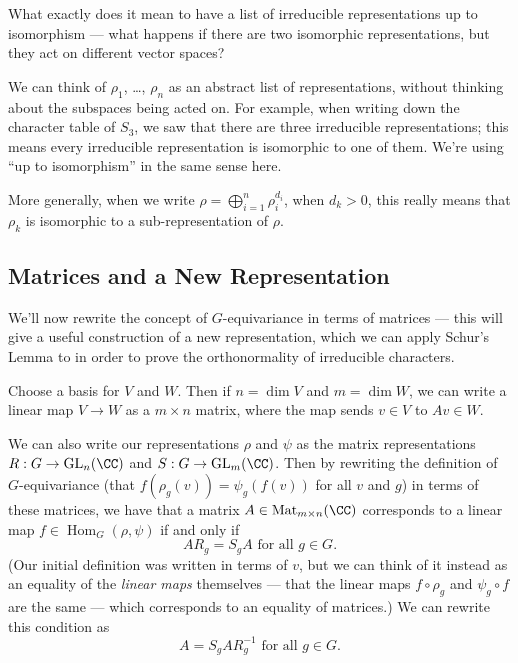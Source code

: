 \begin{question}
What exactly does it mean to have a list of irreducible representations up to isomorphism --- what happens if there are two isomorphic representations, but they act on different vector spaces?
\end{question}

\begin{ans}
We can think of $\rho_1$, \ldots, $\rho_n$ as an abstract list of representations, without thinking about the subspaces being acted on. For example, when writing down the character table of $S_3$, we saw that there are three irreducible representations; this means every irreducible representation is isomorphic to one of them. We're using ``up to isomorphism'' in the same sense here. 

More generally, when we write $\rho = \bigoplus_{i = 1}^n \rho_i^{d_i}$, when $d_k > 0$, this really means that $\rho_k$ is isomorphic to a sub-representation of $\rho$. 
\end{ans}

\subsection{Matrices and a New Representation}

We'll now rewrite the concept of $G$-equivariance in terms of matrices --- this will give a useful construction of a new representation, which we can apply Schur's Lemma to in order to prove the orthonormality of irreducible characters. 

Choose a basis for $V$ and $W$. Then if $n = \dim V$ and $m = \dim W$, we can write a linear map $V \to W$ as a $m \times n$ matrix, where the map sends $v \in V$ to $Av \in W$. 

We can also write our representations $\rho$ and $\psi$ as the matrix representations $R : G \to \operatorname{GL}_n(\CC)$ and $S : G \to \operatorname{GL}_m(\CC)$. Then by rewriting the definition of $G$-equivariance (that $f(\rho_g(v)) = \psi_g(f(v))$ for all $v$ and $g$) in terms of these matrices, we have that a matrix $A \in \operatorname{Mat}_{m\times n}(\CC)$ corresponds to a linear map $f \in \operatorname{Hom}_G(\rho, \psi)$ if and only if \[AR_g = S_gA \text{ for all } g \in G.\] (Our initial definition was written in terms of $v$, but we can think of it instead as an equality of the \emph{linear maps} themselves --- that the linear maps $f \circ \rho_g$ and $\psi_g \circ f$ are the same --- which corresponds to an equality of matrices.) We can rewrite this condition as \[A = S_gAR_g^{-1} \text{ for all } g \in G.\] 

